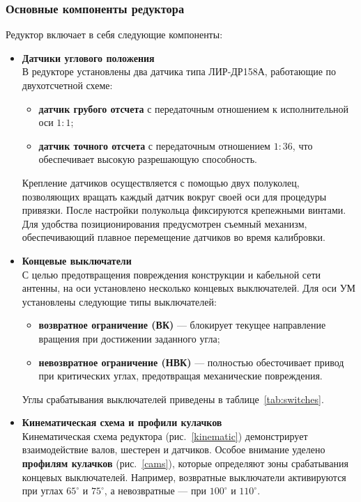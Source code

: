 \subsubsection{Основные компоненты редуктора}
Редуктор включает в себя следующие компоненты:
\begin{itemize}
    \item \textbf{Датчики углового положения} \\
    В редукторе установлены два датчика типа ЛИР-ДР158А, работающие по двухотсчетной схеме:
    \begin{itemize}
        \item \textbf{датчик грубого отсчета} с передаточным отношением к исполнительной оси \(1:1\);
        \item \textbf{датчик точного отсчета} с передаточным отношением \(1:36\), что обеспечивает высокую разрешающую способность.
    \end{itemize}
    Крепление датчиков осуществляется с помощью двух полуколец, позволяющих вращать каждый датчик вокруг своей оси для процедуры привязки. %
    После настройки полукольца фиксируются крепежными винтами. Для удобства позиционирования предусмотрен съемный механизм, 
    обеспечивающий плавное перемещение датчиков во время калибровки.

    \item \textbf{Концевые выключатели} \\
    С целью предотвращения повреждения конструкции и кабельной сети антенны, на оси установлено несколько концевых выключателей. 
    Для оси УМ установлены следующие типы выключателей:
    \begin{itemize}
        \item \textbf{возвратное ограничение (ВК)} — блокирует текущее направление вращения при достижении заданного угла;
        \item \textbf{невозвратное ограничение (НВК)} — полностью обесточивает привод при критических углах, предотвращая механические повреждения.
    \end{itemize}
    Углы срабатывания выключателей приведены в таблице~\ref{tab:switches}.

    \item \textbf{Кинематическая схема и профили кулачков} \\
    Кинематическая схема редуктора (рис.~\ref{kinematic}) демонстрирует взаимодействие валов, шестерен и датчиков. Особое внимание уделено \textbf{профилям кулачков} (рис.~\ref{cams}), 
    которые определяют зоны срабатывания концевых выключателей. 
    Например, возвратные выключатели активируются при углах \(65^\circ\) и \(75^\circ\), а невозвратные — при \(100^\circ\) и \(110^\circ\).
\end{itemize}

